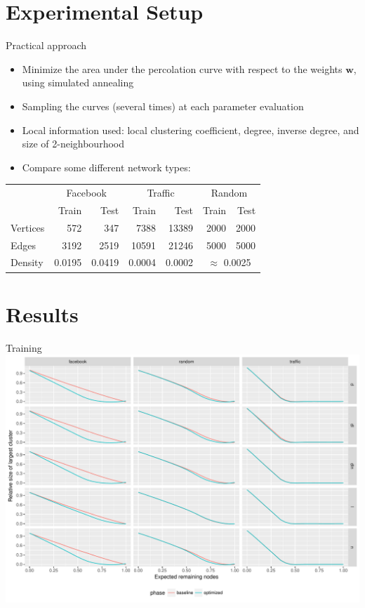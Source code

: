 \documentclass{beamer}
\begin{document}
\section{Experimental Setup}
\begin{frame}{Practical approach}
  \begin{itemize}
  \item Minimize the area under the percolation curve with respect to the weights \(\mathbf{w}\),
    using simulated annealing
  \item Sampling the curves (several times) at each parameter evaluation
  \item Local information used: local clustering coefficient, degree, inverse degree, and size of
    2-neighbourhood
  \item Compare some different network types:
  \end{itemize}

  \begin{center}
    \begin{tabular}{lrrrrrr}
      \toprule
      & \multicolumn{2}{c}{Facebook} & \multicolumn{2}{c}{Traffic} & \multicolumn{2}{c}{Random} \\
      & Train & Test & Train & Test & Train & Test \\
      \midrule
      Vertices & 572 & 347 & 7388 & 13389 & 2000 & 2000\\
      Edges & 3192 & 2519 & 10591 & 21246 & 5000 & 5000\\
      Density & 0.0195 & 0.0419 & 0.0004 & 0.0002 & \multicolumn{2}{c}{\(\approx\) 0.0025}\\
      \bottomrule
    \end{tabular}
  \end{center}
\end{frame}



\section{Results}
\begin{frame}{Training}
  \includegraphics[width=\textwidth]{training.pdf}
\end{frame}
\end{document}
